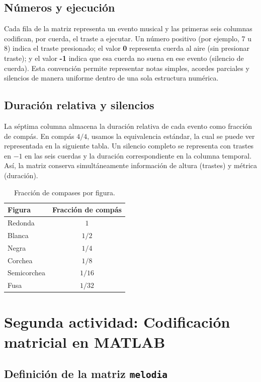 \documentclass{article}
\theoremstyle{plain}
\theoremstyle{definition}
\begin{document}
\subsection*{Números y ejecución}
Cada fila de la matriz representa un evento musical y las primeras seis columnas codifican, por cuerda, el traste a ejecutar. Un número positivo (por ejemplo, 7 u 8) indica el traste presionado; el valor \textbf{0} representa cuerda al aire (sin presionar traste); y el valor \textbf{-1} indica que esa cuerda no suena en ese evento (silencio de cuerda). Esta convención permite representar notas simples, acordes parciales y silencios de manera uniforme dentro de una sola estructura numérica.

\subsection*{Duración relativa y silencios}
La séptima columna almacena la duración relativa de cada evento como fracción de compás. En compás \(4/4\), usamos la equivalencia estándar, la cual se puede ver representada en la siguiente tabla. Un silencio completo se representa con trastes en \(-1\) en las seis cuerdas y la duración correspondiente en la columna temporal. Así, la matriz conserva simultáneamente información de altura (trastes) y métrica (duración).

\begin{table}[]
    \centering
    \begin{tabular}{lc}
        \toprule
        \textbf{Figura} & \textbf{Fracción de compás} \\
        \midrule
        Redonda     & $1$      \\
        Blanca      & $1/2$    \\
        Negra       & $1/4$    \\
        Corchea     & $1/8$    \\
        Semicorchea & $1/16$   \\
        Fusa        & $1/32$   \\
        \bottomrule
    \end{tabular}
    \caption{Fracción de compases por figura.}
    \label{tab:placeholder}
\end{table}

\section*{Segunda actividad: Codificación matricial en MATLAB}
\subsection*{Definición de la matriz \texttt{melodia}}
\end{document}
